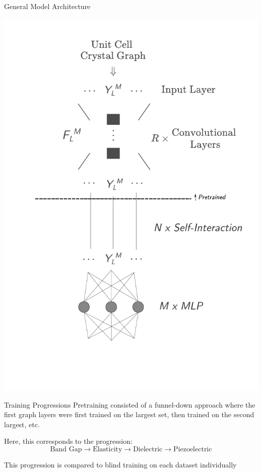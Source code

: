 \documentclass[11pt]{beamer}
\begin{document}
\begin{frame}{General Model Architecture}
\begin{center}
\includegraphics[scale=0.5]{architecture.pdf}
\end{center}
\end{frame}

\begin{frame}{Training Progressions}
Pretraining consisted of a funnel-down approach where the first graph layers were first trained on the largest set, then trained on the second largest, etc.

\vspace{1cm}

Here, this corresponds to the progression:
$$
\text{Band Gap} \rightarrow \text{Elasticity} \rightarrow \text{Dielectric} \rightarrow \text{Piezoelectric}
$$

This progression is compared to blind training on each dataset individually
\end{frame}
\end{document}
